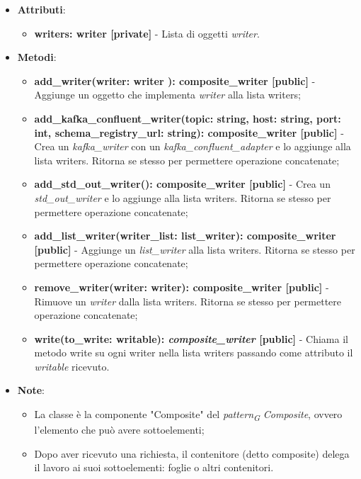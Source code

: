 \begin{itemize}
\begin{itemize}
    \item\textbf{Attributi}:
        \begin{itemize}
        \item \textbf{writers: writer [private]} - Lista di oggetti \textit{writer}.
    \end{itemize}
    \item \textbf{Metodi}:
    \begin{itemize}
        \item \textbf{add\_writer(writer: writer ): composite\_writer [public]} - Aggiunge un oggetto che implementa \textit{writer} alla lista writers;
        \item \textbf{add\_kafka\_confluent\_writer(topic: string, host: string, port: int, schema\_registry\_url: string): composite\_writer [public]} - Crea un \textit{kafka\_writer} con un \textit{kafka\_confluent\_adapter} e lo aggiunge alla lista writers. Ritorna se stesso per permettere operazione concatenate;
        \item \textbf{add\_std\_out\_writer(): composite\_writer [public]} - Crea un \textit{std\_out\_writer} e lo aggiunge alla lista writers. Ritorna se stesso per permettere operazione concatenate;
        \item \textbf{add\_list\_writer(writer\_list: list\_writer): composite\_writer [public]} - Aggiunge un \textit{list\_writer} alla lista writers. Ritorna se stesso per permettere operazione concatenate;
        \item \textbf{remove\_writer(writer: writer): composite\_writer [public]} - Rimuove un \textit{writer} dalla lista writers.  Ritorna se stesso per permettere operazione concatenate;
        \item \textbf{write(to\_write: writable): \textit{composite\_writer} [public]} - Chiama il metodo write su ogni writer nella lista writers passando come attributo il \textit{writable} ricevuto.
    \end{itemize}
    \item\textbf{Note}:
        \begin{itemize}
            \item La classe è la componente "Composite" del \textit{pattern}\textsubscript{\textit{G}} \textit{Composite}, ovvero l'elemento che può avere sottoelementi;
            \item Dopo aver ricevuto una richiesta, il contenitore (detto composite) delega il lavoro ai suoi sottoelementi: foglie o altri contenitori.
        \end{itemize}

\end{itemize}
\end{itemize}
